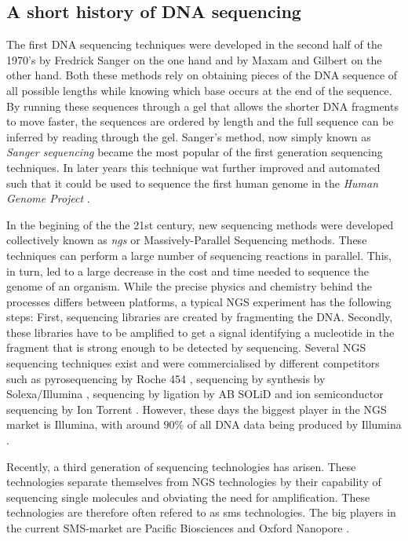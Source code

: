 \subsection{A short history of DNA sequencing}

The first DNA sequencing techniques were developed in the second half of the 1970's by Fredrick Sanger \cite{Sanger1977} on the one hand and by Maxam and Gilbert \cite{Maxam1977} on the other hand. Both these methods rely on obtaining pieces of the DNA sequence of all possible lengths while knowing which base occurs at the end of the sequence. By running these sequences through a gel that allows the shorter DNA fragments to move faster, the sequences are ordered by length and the full sequence can be inferred by reading through the gel. Sanger's method, now simply known as \emph{Sanger sequencing} became the most popular of the first generation sequencing techniques. In later years this technique wat further improved and automated such that it could be used to sequence the first human genome in the \emph{Human Genome Project} \cite{Venter2001}.

In the begining of the the 21st century, new sequencing methods were developed collectively known as \emph{\gls{ngs}} or Massively-Parallel Sequencing methods. These techniques can perform a large number of sequencing reactions in parallel. This, in turn, led to a large decrease in the cost and time needed to sequence the genome of an organism. While the precise physics and chemistry behind the processes differs between platforms, a typical NGS experiment has the following steps: First, sequencing libraries are created by fragmenting the DNA. Secondly, these libraries have to be amplified to get a signal identifying a nucleotide in the fragment that is strong enough to be detected by sequencing. Several NGS sequencing techniques exist and were commercialised by different competitors such as pyrosequencing by Roche 454 \cite{Margulies2005}, sequencing by synthesis by Solexa/Illumina \cite{Turcatti2008}, sequencing by ligation by AB SOLiD \cite{Shendure2005} and ion semiconductor sequencing by Ion Torrent \cite{Rothberg2011}. However, these days the biggest player in the NGS market is Illumina, with around $90\%$ of all DNA data being produced by Illumina \cite{Illumina2016}.

Recently, a third generation of sequencing technologies has arisen. These technologies separate themselves from NGS technologies by their capability of sequencing single molecules and obviating the need for amplification. These technologies are therefore often refered to as \gls{sms} technologies. The big players in the current SMS-market are Pacific Biosciences \cite{Eid2009} and Oxford Nanopore \cite{Clarke2009}.

